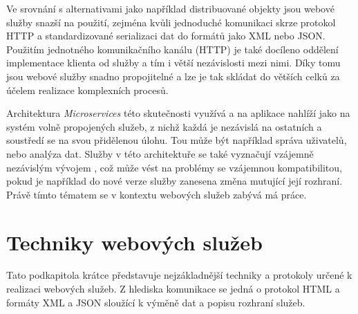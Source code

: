 \documentclass[czech,DP]{thesiskiv}
\begin{document}
Ve srovnání s alternativami jako například distribuované objekty jsou webové služby snazší na použití, zejména kvůli jednoduché komunikaci skrze protokol HTTP a standardizované serializaci dat do formátů jako XML nebo JSON. Použitím jednotného komunikačního kanálu (HTTP) je také docíleno oddělení implementace klienta od služby a tím i větší nezávislosti mezi nimi. Díky tomu jsou webové služby snadno propojitelné a lze je tak skládat do větších celků za účelem realizace komplexních procesů\cite{fromObjectsToWs}.

Architektura \textit{Microservices} této skutečnosti využívá a na aplikace nahlíží jako na systém volně propojených služeb, z nichž každá je nezávislá na ostatních a soustředí se na svou přidělenou úlohu. Tou může být například správa uživatelů, nebo analýza dat. Služby v této architektuře se také vyznačují vzájemně nezávislým vývojem \cite{microservices}, což může vést na problémy se vzájemnou kompatibilitou, pokud je například do nové verze služby zanesena změna mutující její rozhraní. Právě tímto tématem se v kontextu webových služeb zabývá má práce.



\section{Techniky webových služeb}
\label{sec:ws-tech}

Tato podkapitola krátce představuje nejzákladnější techniky a protokoly určené k realizaci webových služeb. Z hlediska komunikace se jedná o protokol HTML a formáty XML a JSON sloužící k výměně dat a popisu rozhraní služeb.
\end{document}

